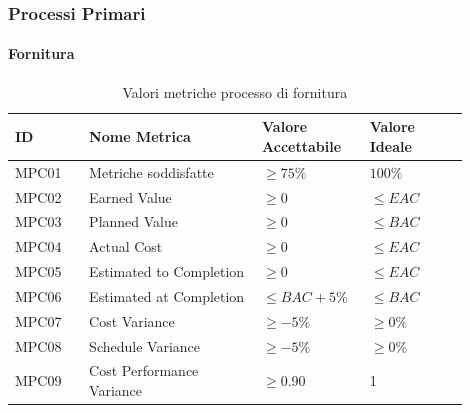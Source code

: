 \documentclass[a4paper,12pt]{article}
\begin{document}
            \subsubsection{Processi Primari}
                \paragraph{Fornitura} \mbox{}
                    \begin{longtable}{|M{0.15\linewidth}|M{0.35\linewidth}|M{0.2\linewidth}|M{0.2\linewidth}|}

                        \caption{Valori metriche processo di fornitura} \\
                        \hline
                        \textbf{ID} & \textbf{Nome Metrica} & \textbf{Valore Accettabile} & \textbf{Valore Ideale} \\
                        \hline
                        \endhead

                        MPC01 & Metriche soddisfatte & $\ge 75\%$ & $100\%$ \\
                        \hline

                        MPC02 & Earned Value & $\ge 0$ & $\le EAC$ \\
                        \hline
                        
                        MPC03 & Planned Value & $\ge 0$ & $\le BAC$ \\
                        \hline
                        
                        MPC04 & Actual Cost & $\ge 0$ & $\le EAC$\\
                        \hline
                        
                        MPC05 & Estimated to Completion & $\ge 0$ & $\le EAC$ \\
                        \hline

                        MPC06 & Estimated at Completion & $\le BAC + 5\%$ & $\le BAC$ \\
                        \hline

                        MPC07 & Cost Variance & $\ge -5\%$ & $\ge 0\%$\\
                        \hline

                        MPC08 & Schedule Variance & $\ge -5\%$ & $\ge 0\%$\\
                        \hline

                        MPC09 & Cost Performance Variance & $\ge 0.90$ & 1 \\
                        \hline

                    \end{longtable}
\end{document}
